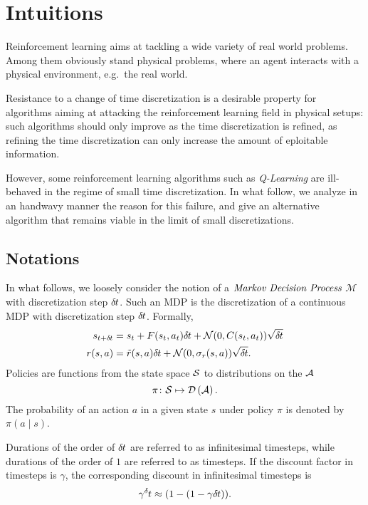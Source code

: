 
\section{Intuitions}
\label{sec:intuitions}
Reinforcement learning aims at tackling a wide variety of real world problems.
Among them obviously stand physical problems, where an agent interacts with a
physical environment, e.g.\ the real world.

Resistance to a change of time discretization is a desirable property for
algorithms aiming at attacking the reinforcement learning field in physical
setups: such algorithms should only improve as the time discretization is
refined, as refining the time discretization can only increase the amount of 
eploitable information.

However, some reinforcement learning algorithms such as \emph{Q-Learning} are
ill-behaved in the regime of small time discretization. In what follow, we
analyze in an handwavy manner the reason for this failure, and give an alternative
algorithm that remains viable in the limit of small discretizations.

\subsection{Notations}
In what follows, we loosely consider the notion of a $\emph{Markov Decision Process}$
$\mathcal{M}$ with discretization step $\delta\hspace{-.06em}t$. Such an MDP is the discretization
of a continuous MDP with discretization step $\delta\hspace{-.06em}t$.
Formally,
\begin{align}
	s_{t + \delta\hspace{-.06em}t} &= s_t + F(s_t, a_t) \delta\hspace{-.06em}t + \mathcal{N}(0, C(s_t, a_t)) \sqrt{\delta\hspace{-.06em}t}\\
	r(s, a) &= \tilde{r}(s, a) \delta\hspace{-.06em}t + \mathcal{N}(0, \sigma_r(s, a)) \sqrt{\delta\hspace{-.06em}t}.
\end{align}
Policies are functions from the state space $\mathcal{S}$ to distributions on the
$\mathcal{A}$
\begin{equation}
	\pi\colon \mathcal{S} \mapsto \mathcal{D}\left(\mathcal{A}\right).
\end{equation}
The probability of an action $a$ in a given state $s$ under policy $\pi$ is
denoted by $\pi\left(a\mid s\right)$.

Durations of the order of $\delta\hspace{-.06em}t$ are referred to as infinitesimal
timesteps, while durations of the order of $1$ are referred to as timesteps.
If the discount factor in timesteps is $\gamma$, the corresponding
discount in infinitesimal timesteps is
\begin{equation}
	\gamma^\deltat \approx (1 - (1 - \gamma \deltat)).
\end{equation}

